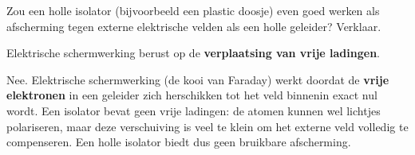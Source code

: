 \documentclass{ximera}
\begin{document}
\begin{question}
    Zou een holle isolator (bijvoorbeeld een plastic doosje) even goed werken als afscherming tegen externe elektrische velden als een holle geleider? Verklaar.

    \begin{multipleChoice}
    \end{multipleChoice}

    \begin{hint}
        Elektrische schermwerking berust op de \textbf{verplaatsing van vrije ladingen}.
    \end{hint}

    \begin{solution}\nl
        Nee. Elektrische schermwerking (de kooi van Faraday) werkt doordat de \textbf{vrije elektronen} in een geleider zich herschikken tot het veld binnenin exact nul wordt. Een isolator bevat geen vrije ladingen: de atomen kunnen wel lichtjes polariseren, maar deze verschuiving is veel te klein om het externe veld volledig te compenseren. Een holle isolator biedt dus geen bruikbare afscherming.
    \end{solution}
\end{question}
\end{document}
